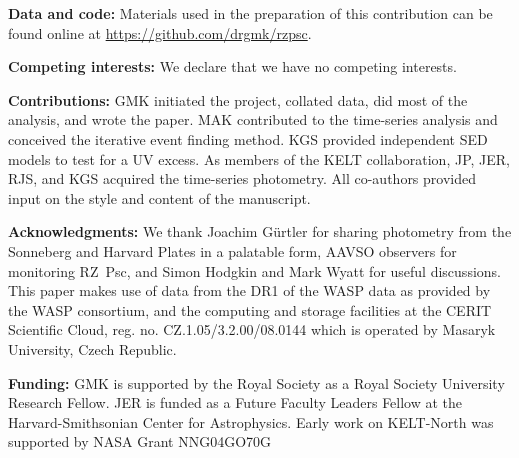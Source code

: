 \documentclass[]{rsos}
\begin{document}
\ack{}

\textbf{Data and code:} Materials used in the preparation of this contribution can be
found online at \href{https://github.com/drgmk/rzpsc}{https://github.com/drgmk/rzpsc}.

\textbf{Competing interests:} We declare that we have no competing interests.

\textbf{Contributions:} GMK initiated the project, collated data, did most of the
analysis, and wrote the paper. MAK contributed to the time-series analysis and conceived
the iterative event finding method. KGS provided independent SED models to test for a UV
excess. As members of the KELT collaboration, JP, JER, RJS, and KGS acquired the
time-series photometry. All co-authors provided input on the style and content of the
manuscript.

\textbf{Acknowledgments:} We thank Joachim G\"urtler for sharing photometry from the
Sonneberg and Harvard Plates in a palatable form, AAVSO observers for monitoring RZ~Psc,
and Simon Hodgkin and Mark Wyatt for useful discussions. This paper makes use of data
from the DR1 of the WASP data \cite{2010A&A...520L..10B} as provided by the WASP
consortium, and the computing and storage facilities at the CERIT Scientific Cloud,
reg. no. CZ.1.05/3.2.00/08.0144 which is operated by Masaryk University, Czech Republic.

\textbf{Funding:} GMK is supported by the Royal Society as a Royal Society University
Research Fellow. JER is funded as a Future Faculty Leaders Fellow at the
Harvard-Smithsonian Center for Astrophysics. Early work on KELT-North was supported by
NASA Grant NNG04GO70G

% 
\end{document}
